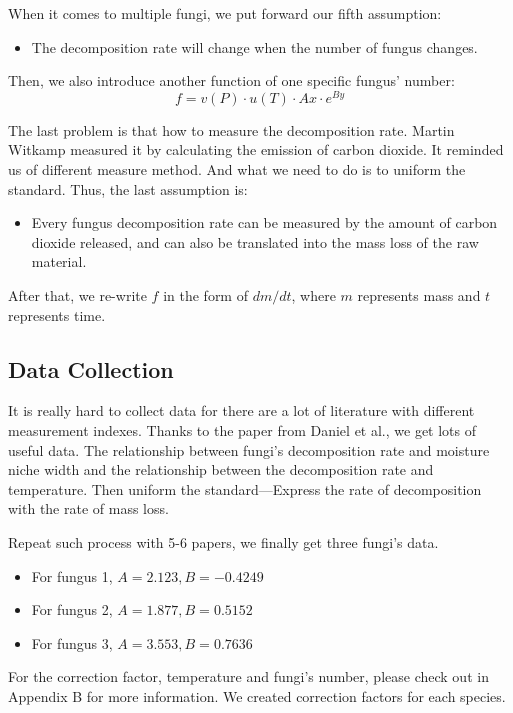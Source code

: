 \documentclass{mcmthesis}
\begin{document}
When it comes to multiple fungi, we put forward our fifth assumption:
\begin{itemize}
  \item The decomposition rate will change when the number of fungus changes.
\end{itemize}
Then, we also introduce another function of one specific fungus' number:
\begin{equation}
  f=v(P)\cdot u(T)\cdot Ax\cdot e^{By}
\end{equation}

The last problem is that how to measure the decomposition rate.
Martin Witkamp\cite{10.2307/1933765} measured it by calculating the emission of carbon dioxide.
It reminded us of different measure method.
And what we need to do is to uniform the standard.
Thus, the last assumption is:
\begin{itemize}
  \item Every fungus decomposition rate can be measured by the amount of carbon dioxide released, and can also be translated into the mass loss of the raw material.
\end{itemize}
After that, we re-write $f$ in the form of $dm/dt$, where $m$ represents mass and $t$ represents time.

\subsection{Data Collection}
It is really hard to collect data for there are a lot of literature with different measurement indexes.
Thanks to the paper from Daniel et al.\cite{maynard2019consistent}, we get lots of useful data.
The relationship between fungi's decomposition rate and moisture niche width and the relationship between the decomposition rate and temperature.
Then uniform the standard---Express the rate of decomposition with the rate of mass loss.

Repeat such process with 5-6 papers, we finally get three fungi's data.

\begin{itemize}
  \item For fungus 1, $A=2.123,B=-0.4249$
  \item For fungus 2, $A=1.877,B=0.5152$
  \item For fungus 3, $A=3.553,B=0.7636$
\end{itemize}

For the correction factor, temperature and fungi's number, please check out in Appendix B for more information.
We created correction factors for each species.
\end{document}
